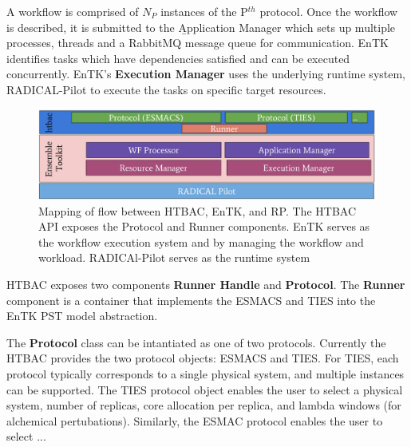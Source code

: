 
A workflow is comprised of $N_P$ instances of the P$^{th}$ protocol. Once the
workflow is described, it is submitted to the
\b{Application Manager} which sets up multiple processes, threads and a
RabbitMQ message queue for communication. EnTK identifies tasks which have
dependencies satisfied and can be executed concurrently. EnTK's
\textbf{Execution Manager} uses the underlying runtime system, RADICAL-Pilot
to execute the tasks on specific target resources.

\begin{figure}
  \centering
   \includegraphics[width=\columnwidth]{figures/isc_htbac_integration_with_entk_RP.pdf}
  \caption{Mapping of flow between HTBAC, EnTK, and RP. The HTBAC API exposes the Protocol
  and Runner components. EnTK serves as the workflow execution system and
  by managing the workflow and workload. RADICAl-Pilot serves as the runtime system}
\label{fig:integration}
\end{figure}


HTBAC exposes two components \textbf{Runner Handle} and \textbf{Protocol}.
The \textbf{Runner} component is a container  that implements the ESMACS and TIES into the
EnTK PST model abstraction. 

The \textbf{Protocol} class can be intantiated as one of two protocols.
Currently the HTBAC provides the two protocol objects: ESMACS and TIES. For
TIES, each protocol typically corresponds to a single physical system, and
multiple instances can be supported. The TIES protocol object enables the user
to select a physical system, number of replicas, core allocation per replica,
and lambda windows (for alchemical pertubations). Similarly, the ESMAC
protocol enables the user to select ...



